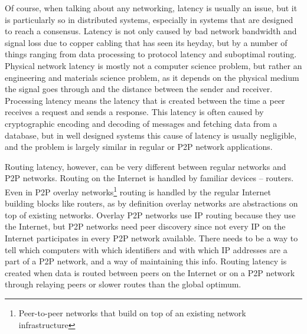 Of course, when talking about any networking, latency is usually an issue, but it is particularly so in distributed systems, especially in systems that are designed to reach a consensus. Latency is not only caused by bad network bandwidth and signal loss due to copper cabling that has seen its heyday, but by a number of things ranging from data processing to protocol latency and suboptimal routing. Physical network latency is mostly not a computer science problem, but rather an engineering and materials science problem, as it depends on the physical medium the signal goes through and the distance between the sender and receiver. Processing latency means the latency that is created between the time a peer receives a request and sends a response. This latency is often caused by cryptographic encoding and decoding of messages and fetching data from a database, but in well designed systems this cause of latency is usually negligible, and the problem is largely similar in regular or P2P network applications.

Routing latency, however, can be very different between regular networks and P2P networks. Routing on the Internet is handled by familiar devices -- routers. Even in P2P overlay networks\footnote{Peer-to-peer networks that build on top of an existing network infrastructure} routing is handled by the regular Internet building blocks like routers, as by definition overlay networks are abstractions on top of existing networks. Overlay P2P networks use IP routing because they use the Internet, but P2P networks need peer discovery since not every IP on the Internet participates in every P2P network available. There needs to be a way to tell which computers with which identifiers and with which IP addresses are a part of a P2P network, and a way of maintaining this info. Routing latency is created when data is routed between peers on the Internet or on a P2P network through relaying peers or slower routes than the global optimum.

